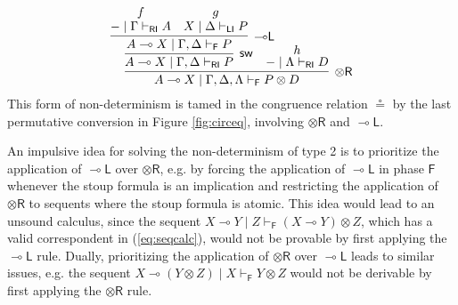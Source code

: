 \documentclass[submission,copyright,creativecommons]{eptcs}
\theoremstyle{definition}
\newcommand{\tr}{\otimes \mathsf{R}}
\newcommand{\lleft}{{\multimap}\mathsf{L}}
\newcommand{\ot}{\otimes}
\newcommand{\lolli}{\multimap}
\newcommand{\RI}{\mathsf{RI}}
\newcommand{\LI}{\mathsf{LI}}
\newcommand{\F}{\mathsf{F}}
\newcommand{\proofbox}[1]{\begin{tabular}{l} #1 \end{tabular}}
\begin{document}
\begin{enumerate}
\begin{equation}
{%
      \infer[\tr]{A \lolli X \mid \Gamma , \Delta , \Lambda \vdash_{\F} P \ot D}{
        \infer[\mathsf{sw}]{A \lolli X \mid \Gamma , \Delta \vdash_{\RI} P}{
          \infer[\lleft]{A \lolli X \mid \Gamma , \Delta \vdash_{\F} P}{
            \deduce{- \mid \Gamma \vdash_{\RI} A}{f}
            &
            \deduce{X \mid \Delta \vdash_{\LI} P}{g}
          }
        }
        &\hspace{-.6cm}
        \deduce{- \mid \Lambda \vdash_{\RI} D}{h}
      }
    }
    \end{equation}
    This form of non-determinism is tamed in the congruence relation $\circeq$ by the last permutative conversion in Figure \ref{fig:circeq}, involving $\tr$ and $\lleft$.
\end{enumerate}


An impulsive idea for solving the non-determinism of type 2 is to prioritize the application of $\lleft$ over $\tr$, e.g. by forcing the application of $\lleft$ in phase $\F$ whenever the stoup formula is an implication and restricting the application of $\tr$ to sequents where the stoup formula is atomic. This idea would lead to an unsound calculus, since the sequent $X \lolli Y \mid Z \vdash_{\F} (X \lolli Y) \ot Z$, which has a valid correspondent in (\ref{eq:seqcalc}), would not be provable by first applying the $\lleft$ rule.
Dually, prioritizing the application of $\tr$ over $\lleft$ leads to similar issues, e.g. the sequent $X \lolli (Y \ot Z) \mid X \vdash_\F Y \ot Z$ would not be derivable by first applying the $\tr$ rule.
\end{document}
